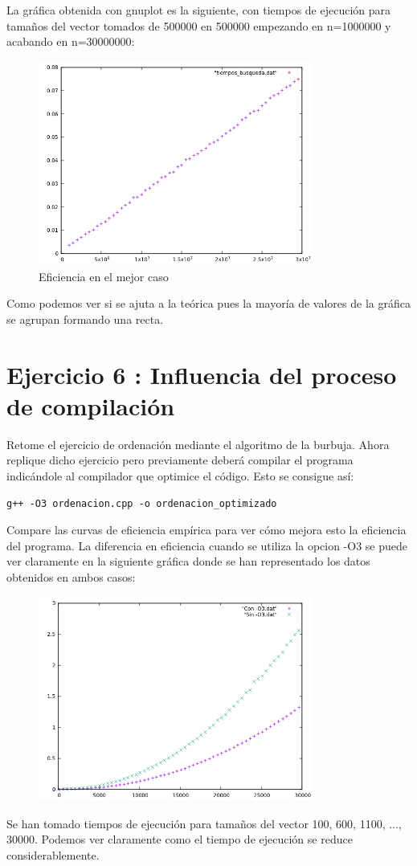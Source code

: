 \documentclass{article}
\begin{document}
La gráfica obtenida con gnuplot es la siguiente, con tiempos de ejecución para tamaños del vector tomados de 500000 en 500000 empezando en n=1000000 y acabando en n=30000000:
\begin{figure}[H]
  \caption{Eficiencia en el mejor caso}
  \centering
  \includegraphics[width=0.8\textwidth]{ejer5/grafica.png}
\end{figure}
Como podemos ver si se ajuta a la teórica pues la mayoría de valores
de la gráfica se agrupan formando una recta.
\clearpage
\section{Ejercicio 6 : Influencia del proceso de compilación}
Retome el ejercicio de ordenación mediante el algoritmo de la burbuja. Ahora replique
dicho ejercicio pero previamente deberá compilar el programa indicándole al compilador
que optimice el código. Esto se consigue así:
\begin{verbatim}
g++ -O3 ordenacion.cpp -o ordenacion_optimizado
\end{verbatim}
Compare las curvas de eficiencia empírica para ver cómo mejora esto la eficiencia del programa.
\clearpage
La diferencia en eficiencia cuando se utiliza la opcion -O3 se puede ver claramente en la siguiente gráfica donde se han representado los datos obtenidos en ambos casos: 
\begin{figure}[H]
  \caption{}
  \centering
  \includegraphics[width=0.8\textwidth]{comparacion.png}
\end{figure}
Se han tomado tiempos de ejecución para tamaños del vector 100, 600, 1100, ..., 30000. Podemos ver claramente como el tiempo de ejecución se reduce considerablemente.
\clearpage
\end{document}
